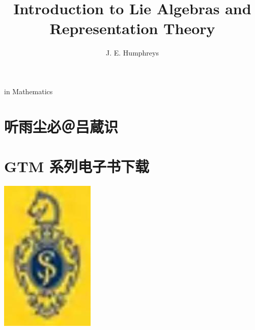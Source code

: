 \documentclass[10pt]{article}
\title{Introduction to Lie Algebras and Representation Theory }
\author{J. E. Humphreys}
\date{}
\begin{document}
\maketitle
in Mathematics

\section*{听雨尘必＠吕蔵识}
\section*{GTM 系列电子书下载}
\begin{center}
\includegraphics[max width=\textwidth]{2025_06_06_fac2836a92464059da43g-001}
\end{center}
\end{document}
